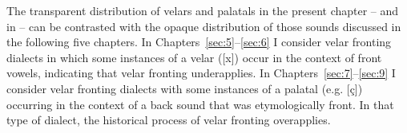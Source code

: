 The transparent distribution of velars and palatals in the present chapter -- and in  -- can be contrasted with the opaque distribution of those sounds discussed in the following five chapters. In Chapters~\ref{sec:5}–\ref{sec:6} I consider velar fronting dialects in which some instances of a velar ([x]) occur in the context of front vowels, indicating that velar fronting underapplies. In Chapters~\ref{sec:7}–\ref{sec:9} I consider velar fronting dialects with some instances of a palatal (e.g. [ç]) occurring in the context of a back sound that was etymologically front. In that type of dialect, the historical process of velar fronting overapplies.
